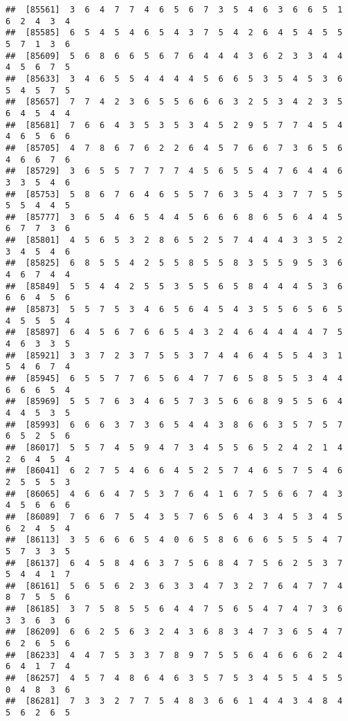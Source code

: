 \documentclass[
]{book}
\begin{document}
\begin{verbatim}
##  [85561]  3  6  4  7  7  4  6  5  6  7  3  5  4  6  3  6  6  5  1  6  2  4  3  4
##  [85585]  6  5  4  5  4  6  5  4  3  7  5  4  2  6  4  5  4  5  5  5  7  1  3  6
##  [85609]  5  6  8  6  6  5  6  7  6  4  4  4  3  6  2  3  3  4  4  4  5  6  7  5
##  [85633]  3  4  6  5  5  4  4  4  4  5  6  6  5  3  5  4  5  3  6  5  4  5  7  5
##  [85657]  7  7  4  2  3  6  5  5  6  6  6  3  2  5  3  4  2  3  5  6  4  5  4  4
##  [85681]  7  6  6  4  3  5  3  5  3  4  5  2  9  5  7  7  4  5  4  4  6  5  6  6
##  [85705]  4  7  8  6  7  6  2  2  6  4  5  7  6  6  7  3  6  5  6  4  6  6  7  6
##  [85729]  3  6  5  5  7  7  7  7  4  5  6  5  5  4  7  6  4  4  6  3  3  5  4  6
##  [85753]  5  8  6  7  6  4  6  5  5  7  6  3  5  4  3  7  7  5  5  5  5  4  4  5
##  [85777]  3  6  5  4  6  5  4  4  5  6  6  6  8  6  5  6  4  4  5  6  7  7  3  6
##  [85801]  4  5  6  5  3  2  8  6  5  2  5  7  4  4  4  3  3  5  2  3  4  5  4  6
##  [85825]  6  8  5  5  4  2  5  5  8  5  5  8  3  5  5  9  5  3  6  4  6  7  4  4
##  [85849]  5  5  4  4  2  5  5  3  5  5  6  5  8  4  4  4  5  3  6  6  6  4  5  6
##  [85873]  5  5  7  5  3  4  6  5  6  4  5  4  3  5  5  6  5  6  5  4  5  5  5  4
##  [85897]  6  4  5  6  7  6  6  5  4  3  2  4  6  4  4  4  4  7  5  4  6  3  3  5
##  [85921]  3  3  7  2  3  7  5  5  3  7  4  4  6  4  5  5  4  3  1  5  4  6  7  4
##  [85945]  6  5  5  7  7  6  5  6  4  7  7  6  5  8  5  5  3  4  4  6  6  6  5  4
##  [85969]  5  5  7  6  3  4  6  5  7  3  5  6  6  8  9  5  5  6  4  4  4  5  3  5
##  [85993]  6  6  6  3  7  3  6  5  4  4  3  8  6  6  3  5  7  5  7  6  5  2  5  6
##  [86017]  5  5  7  4  5  9  4  7  3  4  5  5  6  5  2  4  2  1  4  2  6  4  5  4
##  [86041]  6  2  7  5  4  6  6  4  5  2  5  7  4  6  5  7  5  4  6  2  5  5  5  3
##  [86065]  4  6  6  4  7  5  3  7  6  4  1  6  7  5  6  6  7  4  3  4  5  6  6  6
##  [86089]  7  6  6  7  5  4  3  5  7  6  5  6  4  3  4  5  3  4  5  6  2  4  5  4
##  [86113]  3  5  6  6  6  5  4  0  6  5  8  6  6  6  5  5  5  4  7  5  7  3  3  5
##  [86137]  6  4  5  8  4  6  3  7  5  6  8  4  7  5  6  2  5  3  7  5  4  4  1  7
##  [86161]  5  6  5  6  2  3  6  3  3  4  7  3  2  7  6  4  7  7  4  8  7  5  5  6
##  [86185]  3  7  5  8  5  5  6  4  4  7  5  6  5  4  7  4  7  3  6  3  3  6  3  6
##  [86209]  6  6  2  5  6  3  2  4  3  6  8  3  4  7  3  6  5  4  7  6  2  6  5  6
##  [86233]  4  4  7  5  3  3  7  8  9  7  5  5  6  4  6  6  6  2  4  6  4  1  7  4
##  [86257]  4  5  7  4  8  6  4  6  3  5  7  5  3  4  5  5  4  5  5  0  4  8  3  6
##  [86281]  7  3  3  2  7  7  5  4  8  3  6  6  1  4  4  3  4  8  4  5  6  2  6  5

\end{verbatim}
\end{document}

